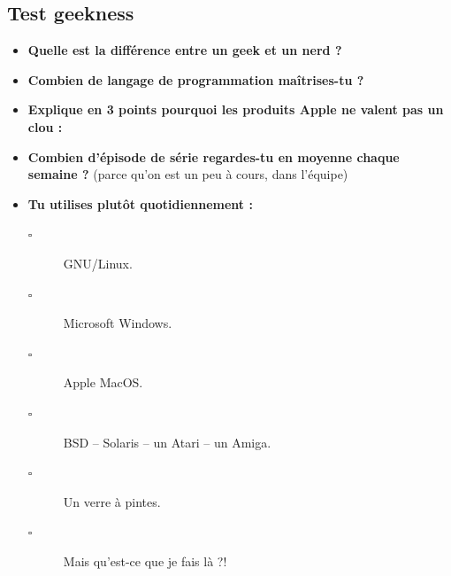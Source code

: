 \subsection*{Test geekness}
\begin{itemize}
    \item \textbf{Quelle est la différence entre un geek et un nerd ?}
    \vspace{1cm}
    \item \textbf{Combien de langage de programmation maîtrises-tu ?}
    \vspace{1cm}
    \item \textbf{Explique en 3 points pourquoi les produits Apple ne valent
	pas un clou :}
    \vspace{2cm}
    \item \textbf{Combien d'épisode de série regardes-tu en moyenne chaque
	semaine ?} (parce qu'on est un peu à cours, dans l'équipe)
    \vspace{2cm}
    
    \item \textbf{Tu utilises plutôt quotidiennement :}
    \begin{description}
	\item[$\square$] GNU/Linux.
	\item[$\square$] Microsoft Windows.
	\item[$\square$] Apple MacOS.
	\item[$\square$] BSD -- Solaris -- un Atari -- un Amiga.
	\item[$\square$] Un verre à pintes.
	\item[$\square$] Mais qu'est-ce que je fais là ?!
    \end{description}


\end{itemize}
